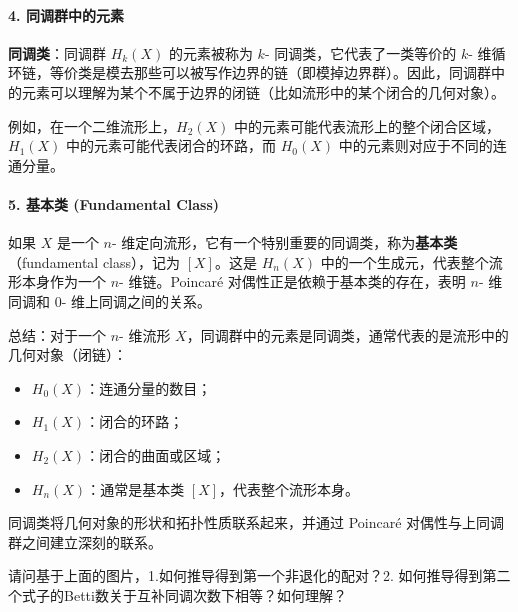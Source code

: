 \documentclass[lang=cn,zihao=5,twoside,fontset=none]{textbook}
\begin{document}
\begin{remark}
\paragraph*{4. 同调群中的元素}
\textbf{同调类}：同调群 $H_k(X)$ 的元素被称为 $k$- 同调类，它代表了一类等价的 $k$- 维循环链，等价类是模去那些可以被写作边界的链（即模掉边界群）。因此，同调群中的元素可以理解为某个不属于边界的闭链（比如流形中的某个闭合的几何对象）。

例如，在一个二维流形上，$H_2(X)$ 中的元素可能代表流形上的整个闭合区域，$H_1(X)$ 中的元素可能代表闭合的环路，而 $H_0(X)$ 中的元素则对应于不同的连通分量。

\paragraph*{5. 基本类 (Fundamental Class)}
如果 $X$ 是一个 $n$- 维定向流形，它有一个特别重要的同调类，称为\textbf{基本类}（fundamental class），记为 $[X]$。这是 $H_n(X)$ 中的一个生成元，代表整个流形本身作为一个 $n$- 维链。Poincaré 对偶性正是依赖于基本类的存在，表明 $n$- 维同调和 $0$- 维上同调之间的关系。

总结：对于一个 $n$- 维流形 $X$，同调群中的元素是同调类，通常代表的是流形中的几何对象（闭链）：
\begin{itemize}
	\item $H_0(X)$：连通分量的数目；
	\item $H_1(X)$：闭合的环路；
	\item $H_2(X)$：闭合的曲面或区域；
	\item $H_n(X)$：通常是基本类 $[X]$，代表整个流形本身。
\end{itemize}
同调类将几何对象的形状和拓扑性质联系起来，并通过 Poincaré 对偶性与上同调群之间建立深刻的联系。
\end{remark}

请问基于上面的图片，1.如何推导得到第一个非退化的配对？2. 如何推导得到第二个式子的Betti数关于互补同调次数下相等？如何理解？
\begin{figure}[htbp]
	\centering
\end{figure}
\end{document}
